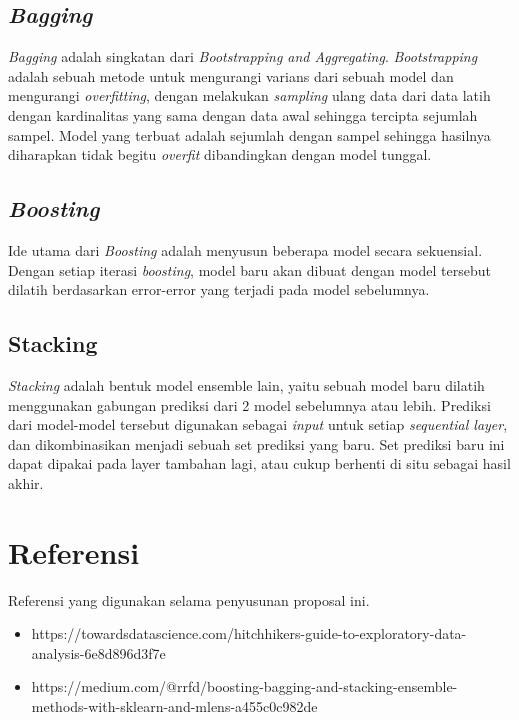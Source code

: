 \documentclass{article}
\begin{document}
\begin{normalsize}
        \subsection{\textit{Bagging}}

        \textit{Bagging} adalah singkatan dari \textit{Bootstrapping and Aggregating}. \textit{Bootstrapping} adalah 
        sebuah metode untuk mengurangi varians dari sebuah model dan mengurangi \textit{overfitting}, dengan melakukan
        \textit{sampling} ulang data dari data latih dengan kardinalitas yang sama dengan data awal sehingga tercipta
        sejumlah sampel. Model yang terbuat adalah sejumlah dengan sampel sehingga hasilnya diharapkan tidak begitu 
        \textit{overfit} dibandingkan dengan model tunggal.

        \subsection{\textit{Boosting}}

        Ide utama dari \textit{Boosting} adalah menyusun beberapa model secara sekuensial. Dengan setiap iterasi 
        \textit{boosting}, model baru akan dibuat dengan model tersebut dilatih berdasarkan error-error yang terjadi
        pada model sebelumnya.

        \subsection{Stacking}

        \textit{Stacking} adalah bentuk model ensemble lain, yaitu sebuah model baru dilatih menggunakan gabungan prediksi
        dari 2 model sebelumnya atau lebih. Prediksi dari model-model tersebut digunakan sebagai \textit{input} untuk 
        setiap \textit{sequential layer}, dan dikombinasikan menjadi sebuah set prediksi yang baru. Set prediksi baru ini 
        dapat dipakai pada layer tambahan lagi, atau cukup berhenti di situ sebagai hasil akhir.
        
        \section{Referensi}

        Referensi yang digunakan selama penyusunan proposal ini.
        \begin{itemize}
            \item https://towardsdatascience.com/hitchhikers-guide-to-exploratory-data-analysis-6e8d896d3f7e
            \item https://medium.com/@rrfd/boosting-bagging-and-stacking-ensemble-methods-with-sklearn-and-mlens-a455c0c982de
        \end{itemize}
    \end{normalsize}
  
\end{document}
